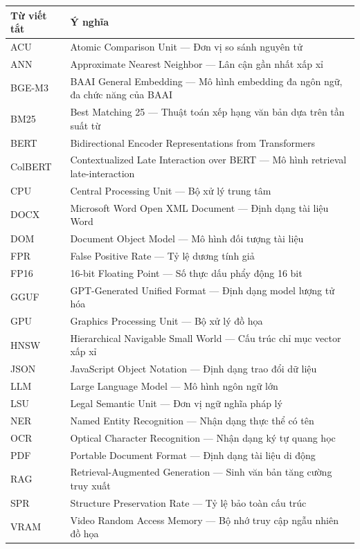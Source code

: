 \documentclass[12pt, a4paper]{report}
\begin{document}
\begin{longtable}{p{3cm} p{10cm}}
    \textbf{Từ viết tắt} & \textbf{Ý nghĩa}\\
    \hline
    ACU & Atomic Comparison Unit — Đơn vị so sánh nguyên tử\\
    ANN & Approximate Nearest Neighbor — Lân cận gần nhất xấp xỉ\\
    BGE-M3 & BAAI General Embedding — Mô hình embedding đa ngôn ngữ, đa chức năng của BAAI\\
    BM25 & Best Matching 25 — Thuật toán xếp hạng văn bản dựa trên tần suất từ\\
    BERT & Bidirectional Encoder Representations from Transformers\\
    ColBERT & Contextualized Late Interaction over BERT — Mô hình retrieval late-interaction\\
    CPU & Central Processing Unit — Bộ xử lý trung tâm\\
    DOCX & Microsoft Word Open XML Document — Định dạng tài liệu Word\\
    DOM & Document Object Model — Mô hình đối tượng tài liệu\\
    FPR & False Positive Rate — Tỷ lệ dương tính giả\\
    FP16 & 16-bit Floating Point — Số thực dấu phẩy động 16 bit\\
    GGUF & GPT-Generated Unified Format — Định dạng model lượng tử hóa\\
    GPU & Graphics Processing Unit — Bộ xử lý đồ họa\\
    HNSW & Hierarchical Navigable Small World — Cấu trúc chỉ mục vector xấp xỉ\\
    JSON & JavaScript Object Notation — Định dạng trao đổi dữ liệu\\
    LLM & Large Language Model — Mô hình ngôn ngữ lớn\\
    LSU & Legal Semantic Unit — Đơn vị ngữ nghĩa pháp lý\\
    NER & Named Entity Recognition — Nhận dạng thực thể có tên\\
    OCR & Optical Character Recognition — Nhận dạng ký tự quang học\\
    PDF & Portable Document Format — Định dạng tài liệu di động\\
    RAG & Retrieval-Augmented Generation — Sinh văn bản tăng cường truy xuất\\
    SPR & Structure Preservation Rate — Tỷ lệ bảo toàn cấu trúc\\
    VRAM & Video Random Access Memory — Bộ nhớ truy cập ngẫu nhiên đồ họa\\

\end{longtable}
\end{document}
